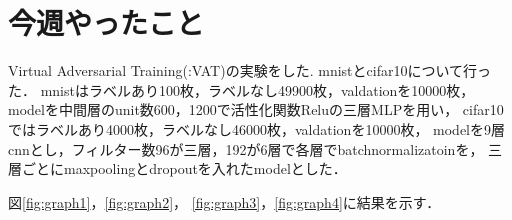 \documentclass[twocolumn]{jarticle}     %
\begin{document}


\section{今週やったこと}

Virtual Adversarial Training(:VAT)の実験をした.
mnistとcifar10について行った．
mnistはラベルあり100枚，ラベルなし49900枚，valdationを10000枚，
modelを中間層のunit数600，1200で活性化関数Reluの三層MLPを用い，
cifar10ではラベルあり4000枚，ラベルなし46000枚，valdationを10000枚，
modelを9層cnnとし，フィルター数96が三層，192が6層で各層でbatchnormalizatoinを，
三層ごとにmaxpoolingとdropoutを入れたmodelとした．

図\ref{fig:graph1}，\ref{fig:graph2}，
\ref{fig:graph3}，\ref{fig:graph4}に結果を示す．
\end{document}
